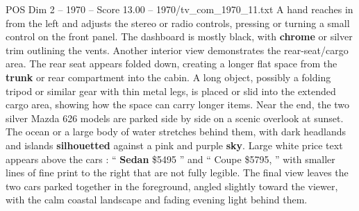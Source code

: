 \begin{textsample}{POS Dim 2 – 1970 – Score 13.00 – 1970/tv\_com\_1970\_11.txt}
A hand reaches in from the left and adjusts the stereo or radio controls, pressing or turning a small control on the front panel.
The dashboard is mostly black, with \textbf{chrome} or silver trim outlining the vents.
Another interior view demonstrates the rear-seat/cargo area.
The rear seat appears folded down, creating a longer flat space from the \textbf{trunk} or rear compartment into the cabin.
A long object, possibly a folding tripod or similar gear with thin metal legs, is placed or slid into the extended cargo area, showing how the space can carry longer items.
Near the end, the two silver Mazda 626 models are parked side by side on a scenic overlook at sunset.
The ocean or a large body of water stretches behind them, with dark headlands and islands \textbf{silhouetted} against a pink and purple \textbf{sky}.
Large white price text appears above the cars : “ \textbf{Sedan} \$5495 ” and “ Coupe \$5795, ” with smaller lines of fine print to the right that are not fully legible.
The final view leaves the two cars parked together in the foreground, angled slightly toward the viewer, with the calm coastal landscape and fading evening light behind them.

\end{textsample}
